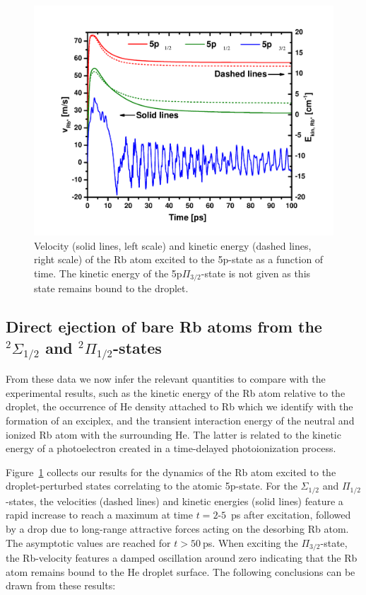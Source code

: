 \begin{figure}[!]
	\includegraphics[width=1.0\linewidth,clip=true]{fig6}
	\caption{\label{fig:simvel} 
		Velocity (solid lines, left scale) and kinetic energy (dashed lines, right scale) of the Rb atom excited to the 5p-state as a function of time. The kinetic energy of the 5p$\Pi_{3/2}$-state is not given as this state remains bound to the droplet.}
\end{figure}
\subsection{Direct ejection of bare Rb atoms from the $^2\Sigma_{1/2}$ and $^2\Pi_{1/2}$-states}
From these data we now infer the relevant quantities to compare with the experimental results, such as the kinetic energy of the Rb atom relative to the droplet, the occurrence of He density attached to Rb which we identify with the formation of an exciplex, and the transient interaction energy of the neutral and ionized Rb atom with the surrounding He. The latter is related to the kinetic energy of a photoelectron created in a time-delayed photoionization process. 

Figure~\ref{fig:simvel} collects our results for the dynamics of the Rb atom excited to the droplet-perturbed states correlating to the atomic 5p-state. For the $\Sigma_{1/2}$ and $\Pi_{1/2}$-states, the velocities (dashed lines) and kinetic energies (solid lines) feature a rapid increase to reach a maximum at time $t=2$-$5$~ps after excitation, followed by a drop due to long-range attractive forces acting on the desorbing Rb atom. The asymptotic values are reached for $t>50~$ps. When exciting the $\Pi_{3/2}$-state, the Rb-velocity features a damped oscillation around zero indicating that the Rb atom remains bound to the He droplet surface. The following conclusions can be drawn from these results: 

